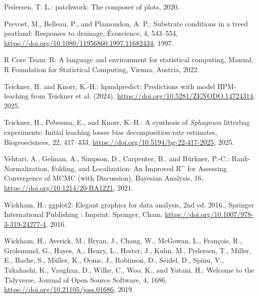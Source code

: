 \documentclass[
  12pt,
]{article}
\newlength{\cslhangindent}
\newlength{\cslentryspacingunit} %
\newenvironment{CSLReferences}[2] %
 {%
  \setlength{\parindent}{0pt}
  \ifodd #1
  \let\oldpar\par
  \def\par{\hangindent=\cslhangindent\oldpar}
  \fi
  \setlength{\parskip}{#2\cslentryspacingunit}
 }%
 {}
\begin{document}
\begin{CSLReferences}{0}{0}
\leavevmode{}%
Pedersen, T. L.: {patchwork}: {The} composer of plots, 2020.

\leavevmode{}%
Prevost, M., Belleau, P., and Plamondon, A. P.: Substrate conditions in a treed peatland: {Responses} to drainage, {É}coscience, 4, 543--554, \url{https://doi.org/10.1080/11956860.1997.11682434}, 1997.

\leavevmode{}%
R Core Team: R: {A} language and environment for statistical computing, Manual, R Foundation for Statistical Computing, Vienna, Austria, 2022.

\leavevmode{}%
Teickner, H. and Knorr, K.-H.: {hpmdpredict}: {Predictions} with model {HPM-leaching} from {Teickner} et al. (2024), \url{https://doi.org/10.5281/ZENODO.14724314}, 2025.

\leavevmode{}%
Teickner, H., Pebesma, E., and Knorr, K.-H.: A synthesis of {\emph{Sphagnum}} litterbag experiments: Initial leaching losses bias decomposition rate estimates, Biogeosciences, 22, 417--433, \url{https://doi.org/10.5194/bg-22-417-2025}, 2025.

\leavevmode{}%
Vehtari, A., Gelman, A., Simpson, D., Carpenter, B., and Bürkner, P.-C.: Rank-{Normalization}, {Folding}, and {Localization}: {An Improved R{\^{}}} for {Assessing Convergence} of {MCMC} (with {Discussion}), Bayesian Analysis, 16, \url{https://doi.org/10.1214/20-BA1221}, 2021.

\leavevmode{}%
Wickham, H.: {ggplot2}: {Elegant} graphics for data analysis, 2nd ed. 2016., Springer International Publishing : Imprint: Springer, Cham, \url{https://doi.org/10.1007/978-3-319-24277-4}, 2016.

\leavevmode{}%
Wickham, H., Averick, M., Bryan, J., Chang, W., McGowan, L., François, R., Grolemund, G., Hayes, A., Henry, L., Hester, J., Kuhn, M., Pedersen, T., Miller, E., Bache, S., Müller, K., Ooms, J., Robinson, D., Seidel, D., Spinu, V., Takahashi, K., Vaughan, D., Wilke, C., Woo, K., and Yutani, H.: Welcome to the {Tidyverse}, Journal of Open Source Software, 4, 1686, \url{https://doi.org/10.21105/joss.01686}, 2019.

\end{CSLReferences}
\end{document}
